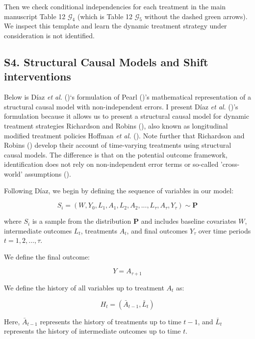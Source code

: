 \documentclass[
  single column]{article}
\begin{document}
Then we check conditional independencies for each treatment in the main
manuscript Table 12 \(\mathcal{G}_4\) (which is Table 12
\(\mathcal{G}_5\) without the dashed green arrows). We inspect this
template and learn the dynamic treatment strategy under consideration is
not identified.

\newpage{}

\subsection{S4. Structural Causal Models and Shift
interventions}\label{s4.-structural-causal-models-and-shift-interventions}

Below is Díaz \emph{et al.} ()`s
formulation of Pearl ()'s mathematical
representation of a structural causal model with non-independent errors.
I present Díaz \emph{et al.} ()'s
formulation because it allows us to present a structural causal model
for dynamic treatment strategies Richardson and Robins
(), also known as longitudinal
modified treatment policies Hoffman \emph{et al.}
(). Note further that Richardson and
Robins () develop their account of
time-varying treatments using structural causal models. The difference
is that on the potential outcome framework, identification does not rely
on non-independent error terms or so-called 'cross-world' assumptions
().

Following Díaz, we begin by defining the sequence of variables in our
model:

\[
S_i= (W, Y_0, L_1, A_1, L_2, A_2, ..., L_\tau, A_\tau, Y_{\tau}) \sim \mathbf{P}
\]

where \(S_i\) is a sample from the distribution \(\mathbf{P}\) and
includes baseline covariates \(W\), intermediate outcomes \(L_t\),
treatments \(A_t\), and final outcomes \(Y_{\tau}\) over time periods
\(t = 1, 2, \ldots, \tau\).

We define the final outcome:

\[
Y = A_{\tau + 1}
\]

We define the history of all variables up to treatment \(A_t\) as:

\[
H_t = (\bar{A}_{t-1}, \bar{L}_t)
\]

Here, \(\bar{A}_{t-1}\) represents the history of treatments up to time
\(t-1\), and \(\bar{L}_t\) represents the history of intermediate
outcomes up to time \(t\).
\end{document}
